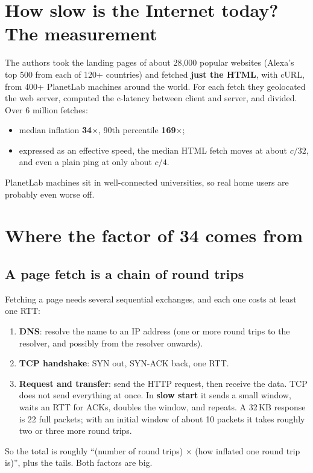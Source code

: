 \section{How slow is the Internet today? The measurement}

The authors took the landing pages of about 28,000 popular websites (Alexa's top 500 from each of 120+ countries) and fetched \textbf{just the HTML}, with
cURL, from 400+ PlanetLab machines around the world. For each fetch they geolocated the web server, computed the c-latency between client and server, and
divided. Over 6 million fetches:
\begin{itemize}
  \item median inflation \textbf{34$\times$}, 90th percentile \textbf{169$\times$};
  \item expressed as an effective speed, the median HTML fetch moves at about $c/32$, and even a plain ping at only about $c/4$.
\end{itemize}
PlanetLab machines sit in well-connected universities, so real home users are probably even worse off.

\section{Where the factor of 34 comes from}

\subsection{A page fetch is a chain of round trips}
Fetching a page needs several sequential exchanges, and each one costs at least one RTT:
\begin{enumerate}
  \item \textbf{DNS}: resolve the name to an IP address (one or more round trips to the resolver, and possibly from the resolver onwards).
  \item \textbf{TCP handshake}: SYN out, SYN-ACK back, one RTT.
  \item \textbf{Request and transfer}: send the HTTP request, then receive the data. TCP does not send everything at once. In \textbf{slow start} it sends a small
        window, waits an RTT for ACKs, doubles the window, and repeats. A 32\,KB response is 22 full packets; with an initial window of about 10 packets it takes roughly
        two or three more round trips.
\end{enumerate}
So the total is roughly ``(number of round trips) $\times$ (how inflated one round trip is)'', plus the tails. Both factors are big.

